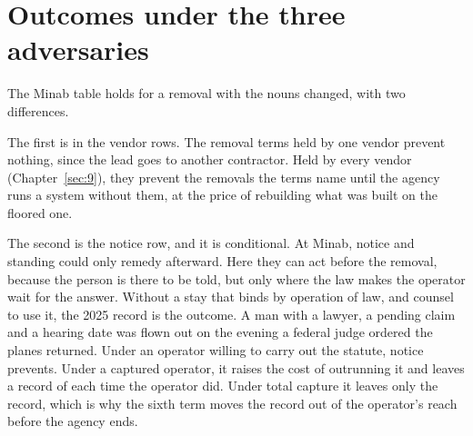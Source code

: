 \section{Outcomes under the three adversaries}
\label{sec:8.7}
The Minab table holds for a removal with the nouns changed, with two differences.

The first is in the vendor rows. The removal terms held by one vendor prevent nothing, since the lead goes to another contractor. Held by every vendor (Chapter~\ref{sec:9}), they prevent the removals the terms name until the agency runs a system without them, at the price of rebuilding what was built on the floored one.

The second is the notice row, and it is conditional. At Minab, notice and standing could only remedy afterward. Here they can act before the removal, because the person is there to be told, but only where the law makes the operator wait for the answer. Without a stay that binds by operation of law, and counsel to use it, the 2025 record is the outcome. A man with a lawyer, a pending claim and a hearing date was flown out on the evening a federal judge ordered the planes returned. Under an operator willing to carry out the statute, notice prevents. Under a captured operator, it raises the cost of outrunning it and leaves a record of each time the operator did. Under total capture it leaves only the record, which is why the sixth term moves the record out of the operator's reach before the agency ends.
